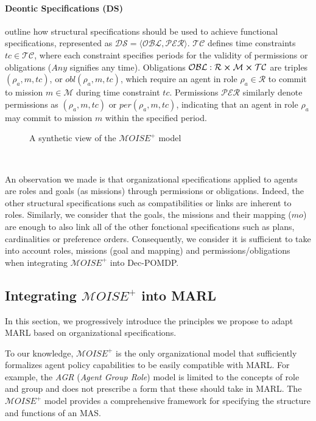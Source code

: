 \documentclass[sigconf,anonymous]{aamas}
\begin{document}
\noindent \paragraph{\textbf{Deontic Specifications (DS)}} outline how structural specifications should be used to achieve functional specifications, represented as $\mathcal{DS} = \langle \mathcal{OBL}, \mathcal{PER} \rangle$. $\mathcal{TC}$ defines time constraints $tc \in \mathcal{TC}$, where each constraint specifies periods for the validity of permissions or obligations ($Any$ signifies any time). Obligations $\mathcal{OBL}: \mathcal{R} \cross \mathcal{M} \cross \mathcal{TC}$ are triples $(\rho_a, m, tc)$, or $obl(\rho_a, m, tc)$, which require an agent in role $\rho_a \in \mathcal{R}$ to commit to mission $m \in \mathcal{M}$ during time constraint $tc$. Permissions $\mathcal{PER}$ similarly denote permissions as $(\rho_a, m, tc)$ or $per(\rho_a, m, tc)$, indicating that an agent in role $\rho_a$ may commit to mission $m$ within the specified period.

\begin{figure}[!]
    
    \caption{A synthetic view of the $\mathcal{M}OISE^+$ model}
    \label{fig:moise_model}
\end{figure}

\

An observation we made is that organizational specifications applied to agents are roles and goals (as missions) through permissions or obligations. Indeed, the other structural specifications such as compatibilities or links are inherent to roles. Similarly, we consider that the goals, the missions and their mapping ($mo$) are enough to also link all of the other fonctional specifications such as plans, cardinalities or preference orders.
Consequently, we consider it is sufficient to take into account roles, missions (goal and mapping) and permissions/obligations when integrating $\mathcal{M}OISE^+$ into Dec-POMDP. 

\subsection{Integrating $\mathcal{M}OISE^+$ into MARL}

In this section, we progressively introduce the principles we propose to adapt MARL based on organizational specifications.

To our knowledge, $\mathcal{M}OISE^+$ is the only organizational model that sufficiently formalizes agent policy capabilities to be easily compatible with MARL. For example, the \textit{AGR} (\textit{Agent Group Role}) model is limited to the concepts of role and group and does not prescribe a form that these should take in MARL. The $\mathcal{M}OISE^+$ model provides a comprehensive framework for specifying the structure and functions of an MAS.
\end{document}
